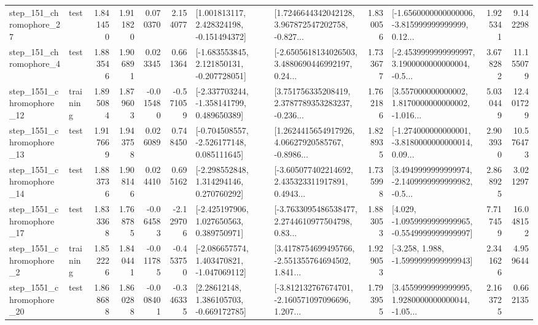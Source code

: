 \begin{tabular}{llrrrrllrlrr}
  step\_151\_chromophore\_27 &      test &      1.841450 &    1.911820 &      0.070370 &  2.154077 &    [1.001813117, 2.428324198, -0.151494372] &  [1.7246644342042128, 3.967872547202758, -0.827... &       1.830056 &  [-1.6560000000000006, -3.815999999999999, 0.12... &            1.925341 &          9.142298 \\
   step\_151\_chromophore\_4 &      test &      1.883546 &    1.906891 &      0.023345 &  0.661364 &   [-1.683553845, 2.121850131, -0.207728051] &  [-2.6505618134026503, 3.4880690446992197, 0.24... &       1.733677 &  [-2.4539999999999997, 3.1900000000000004, -0.5... &            3.678282 &         11.155079 \\
 step\_1551\_chromophore\_12 &  training &      1.895084 &    1.879603 &     -0.015480 & -0.571059 &   [-2.337703244, -1.358141799, 0.489650389] &  [3.751756335208419, 2.3787789353283237, -0.236... &       1.762186 &  [3.557000000000002, 1.8170000000000002, -1.016... &            5.030449 &         12.401729 \\
 step\_1551\_chromophore\_13 &      test &      1.917669 &    1.943758 &      0.026089 &  0.748450 &   [-0.704508557, -2.526177148, 0.085111645] &  [1.2624415654917926, 4.06627920585767, -0.8986... &       1.828935 &  [-1.274000000000001, -3.8180000000000014, 0.09... &            2.903930 &         10.576473 \\
 step\_1551\_chromophore\_14 &      test &      1.883736 &    1.908146 &      0.024410 &  0.695162 &    [-2.298552848, 1.314294146, 0.270760292] &  [-3.605077402214692, 2.435323311917891, 0.4943... &       1.735998 &  [3.4949999999999974, -2.1409999999999982, -0.5... &            2.868925 &          3.021297 \\
 step\_1551\_chromophore\_17 &      test &      1.833368 &    1.768785 &     -0.064583 & -2.129706 &    [-2.425197906, 1.027650563, 0.389750971] &  [-3.7633095486538477, 2.2744610977504798, 0.83... &       1.883053 &  [4.029, -1.0959999999999965, -0.5549999999999997] &            7.717459 &         16.048152 \\
  step\_1551\_chromophore\_2 &  training &      1.852226 &    1.840441 &     -0.011785 & -0.453750 &   [-2.086657574, 1.403470821, -1.047069112] &  [3.4178754699495766, -2.551355764694502, 1.841... &       1.929053 &               [-3.258, 1.988, -1.5999999999999943] &            2.341626 &          4.959644 \\
 step\_1551\_chromophore\_20 &      test &      1.868688 &    1.860288 &     -0.008401 & -0.346335 &     [2.28612148, 1.386105703, -0.669172785] &  [-3.812132767674701, -2.160571097096696, 1.207... &       1.793955 &  [3.4559999999999995, 1.9280000000000044, -1.05... &            2.163725 &          0.662135 \\

\end{tabular}
